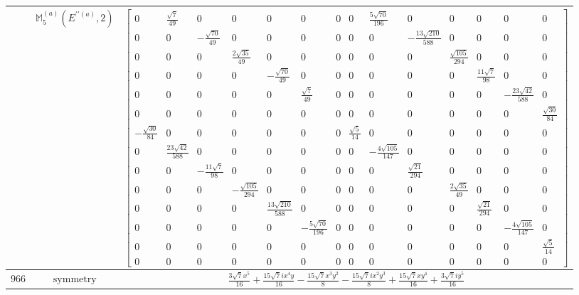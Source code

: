 \documentclass[fleqn,8pt,landscape]{jsarticle}
\begin{document}
\begin{longtable}{ccc}
$  $ & $ \mathbb{M}_{5}^{(a)}(E^{\prime\prime(a)},2) $ & $ \begin{bmatrix} 0 & \frac{\sqrt{7}}{49} & 0 & 0 & 0 & 0 & 0 & 0 & \frac{5 \sqrt{70}}{196} & 0 & 0 & 0 & 0 & 0 \\ 0 & 0 & - \frac{\sqrt{70}}{49} & 0 & 0 & 0 & 0 & 0 & 0 & - \frac{13 \sqrt{210}}{588} & 0 & 0 & 0 & 0 \\ 0 & 0 & 0 & \frac{2 \sqrt{35}}{49} & 0 & 0 & 0 & 0 & 0 & 0 & \frac{\sqrt{105}}{294} & 0 & 0 & 0 \\ 0 & 0 & 0 & 0 & - \frac{\sqrt{70}}{49} & 0 & 0 & 0 & 0 & 0 & 0 & \frac{11 \sqrt{7}}{98} & 0 & 0 \\ 0 & 0 & 0 & 0 & 0 & \frac{\sqrt{7}}{49} & 0 & 0 & 0 & 0 & 0 & 0 & - \frac{23 \sqrt{42}}{588} & 0 \\ 0 & 0 & 0 & 0 & 0 & 0 & 0 & 0 & 0 & 0 & 0 & 0 & 0 & \frac{\sqrt{30}}{84} \\ - \frac{\sqrt{30}}{84} & 0 & 0 & 0 & 0 & 0 & 0 & \frac{\sqrt{5}}{14} & 0 & 0 & 0 & 0 & 0 & 0 \\ 0 & \frac{23 \sqrt{42}}{588} & 0 & 0 & 0 & 0 & 0 & 0 & - \frac{4 \sqrt{105}}{147} & 0 & 0 & 0 & 0 & 0 \\ 0 & 0 & - \frac{11 \sqrt{7}}{98} & 0 & 0 & 0 & 0 & 0 & 0 & \frac{\sqrt{21}}{294} & 0 & 0 & 0 & 0 \\ 0 & 0 & 0 & - \frac{\sqrt{105}}{294} & 0 & 0 & 0 & 0 & 0 & 0 & \frac{2 \sqrt{35}}{49} & 0 & 0 & 0 \\ 0 & 0 & 0 & 0 & \frac{13 \sqrt{210}}{588} & 0 & 0 & 0 & 0 & 0 & 0 & \frac{\sqrt{21}}{294} & 0 & 0 \\ 0 & 0 & 0 & 0 & 0 & - \frac{5 \sqrt{70}}{196} & 0 & 0 & 0 & 0 & 0 & 0 & - \frac{4 \sqrt{105}}{147} & 0 \\ 0 & 0 & 0 & 0 & 0 & 0 & 0 & 0 & 0 & 0 & 0 & 0 & 0 & \frac{\sqrt{5}}{14} \\ 0 & 0 & 0 & 0 & 0 & 0 & 0 & 0 & 0 & 0 & 0 & 0 & 0 & 0 \end{bmatrix} $ \\ \hline
$ 966 $ & $ \text{symmetry} $ & $ \frac{3 \sqrt{7} x^{5}}{16} + \frac{15 \sqrt{7} i x^{4} y}{16} - \frac{15 \sqrt{7} x^{3} y^{2}}{8} - \frac{15 \sqrt{7} i x^{2} y^{3}}{8} + \frac{15 \sqrt{7} x y^{4}}{16} + \frac{3 \sqrt{7} i y^{5}}{16} $ \\

\end{longtable}
\end{document}
